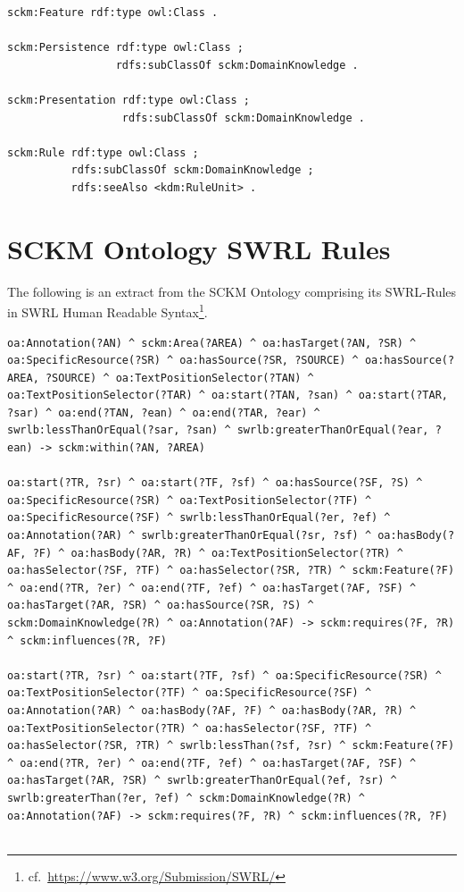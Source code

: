\begin{appendix}
\begin{lstlisting}[language=turtle, captionpos=t, caption=SCKM Ontology Extract]
sckm:Feature rdf:type owl:Class .

sckm:Persistence rdf:type owl:Class ;
                 rdfs:subClassOf sckm:DomainKnowledge .

sckm:Presentation rdf:type owl:Class ;
                  rdfs:subClassOf sckm:DomainKnowledge .

sckm:Rule rdf:type owl:Class ;
          rdfs:subClassOf sckm:DomainKnowledge ;
          rdfs:seeAlso <kdm:RuleUnit> .
\end{lstlisting}
\vspace{-15pt}
\section{SCKM Ontology SWRL Rules}\label{sec:sckm-ontology-rules}
\vspace{15pt}

The following is an extract from the SCKM Ontology comprising its SWRL-Rules in SWRL Human Readable Syntax\footnote{cf.~\url{https://www.w3.org/Submission/SWRL/}}.
\begin{lstlisting}[language=turtle, captionpos=t, caption=SCKM Ontology SWRL Rules]
oa:Annotation(?AN) ^ sckm:Area(?AREA) ^ oa:hasTarget(?AN, ?SR) ^ oa:SpecificResource(?SR) ^ oa:hasSource(?SR, ?SOURCE) ^ oa:hasSource(?AREA, ?SOURCE) ^ oa:TextPositionSelector(?TAN) ^ oa:TextPositionSelector(?TAR) ^ oa:start(?TAN, ?san) ^ oa:start(?TAR, ?sar) ^ oa:end(?TAN, ?ean) ^ oa:end(?TAR, ?ear) ^ swrlb:lessThanOrEqual(?sar, ?san) ^ swrlb:greaterThanOrEqual(?ear, ?ean) -> sckm:within(?AN, ?AREA)

oa:start(?TR, ?sr) ^ oa:start(?TF, ?sf) ^ oa:hasSource(?SF, ?S) ^ oa:SpecificResource(?SR) ^ oa:TextPositionSelector(?TF) ^ oa:SpecificResource(?SF) ^ swrlb:lessThanOrEqual(?er, ?ef) ^ oa:Annotation(?AR) ^ swrlb:greaterThanOrEqual(?sr, ?sf) ^ oa:hasBody(?AF, ?F) ^ oa:hasBody(?AR, ?R) ^ oa:TextPositionSelector(?TR) ^ oa:hasSelector(?SF, ?TF) ^ oa:hasSelector(?SR, ?TR) ^ sckm:Feature(?F) ^ oa:end(?TR, ?er) ^ oa:end(?TF, ?ef) ^ oa:hasTarget(?AF, ?SF) ^ oa:hasTarget(?AR, ?SR) ^ oa:hasSource(?SR, ?S) ^ sckm:DomainKnowledge(?R) ^ oa:Annotation(?AF) -> sckm:requires(?F, ?R) ^ sckm:influences(?R, ?F)

oa:start(?TR, ?sr) ^ oa:start(?TF, ?sf) ^ oa:SpecificResource(?SR) ^ oa:TextPositionSelector(?TF) ^ oa:SpecificResource(?SF) ^ oa:Annotation(?AR) ^ oa:hasBody(?AF, ?F) ^ oa:hasBody(?AR, ?R) ^ oa:TextPositionSelector(?TR) ^ oa:hasSelector(?SF, ?TF) ^ oa:hasSelector(?SR, ?TR) ^ swrlb:lessThan(?sf, ?sr) ^ sckm:Feature(?F) ^ oa:end(?TR, ?er) ^ oa:end(?TF, ?ef) ^ oa:hasTarget(?AF, ?SF) ^ oa:hasTarget(?AR, ?SR) ^ swrlb:greaterThanOrEqual(?ef, ?sr) ^ swrlb:greaterThan(?er, ?ef) ^ sckm:DomainKnowledge(?R) ^ oa:Annotation(?AF) -> sckm:requires(?F, ?R) ^ sckm:influences(?R, ?F)


\end{lstlisting}
\end{appendix}
